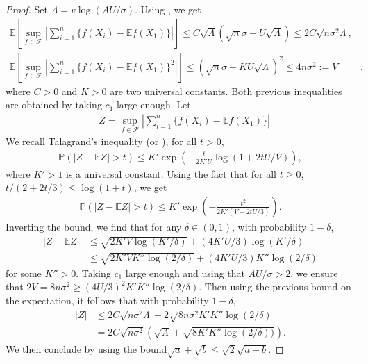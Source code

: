 \begin{proof}
Set $\Lambda = v\log(AU / \sigma )$. Using \cite[equation (2.5) and (2.6)]{gineConsistencyKernelDensity2001}, we get
\begin{align*}
\mathbb E\left [\sup_{f\in \mathcal F} \left| \sum_{i=1} ^n \{ f(X_i) - \mathbb E f(X_1) \}\right|\right] \leq  C\sqrt{\Lambda}\left( \sqrt n\sigma + U\sqrt{\Lambda}    \right) \leq 2 C \sqrt { n\sigma^2 \Lambda} , &\\
\mathbb E\left [\sup_{f\in \mathcal F} \left| \sum_{i=1} ^n \{ f(X_i) - \mathbb E f(X_1) \}^2\right|\right] \leq  \left( \sqrt n \sigma  +   KU  \sqrt {  \Lambda} \right)^2 \leq 4  n \sigma^2 := V&,
\end{align*}
where $C>0$ and $K>0$ are two universal constants. Both previous inequalities are obtained by taking $c_1$ large enough. Let
\begin{align*}
&Z = \sup_{f\in \mathcal F} \left| \sum_{i=1} ^n \{ f(X_i) - \mathbb E f(X_1) \}\right|
\end{align*}
We recall Talagrand's inequality \citep[Theorem 1.4]{talagrandNewConcentrationInequalities1996} (or \cite[equation (2.7)]{gineConsistencyKernelDensity2001}), for all $t>0$,
\begin{align*}
\mathbb P \left(| Z - \mathbb E Z | >t  \right )\leq K' \exp\left( - \frac{t}{2K'U} \log( 1+ 2tU / V)   \right),
\end{align*}
where $K'>1$ is a universal constant. Using the fact that for all $t\geq 0$, $  t / (2+2t/3) \leq \log( 1+ t )$, we get
\begin{align*}
\mathbb P \left(| Z - \mathbb E Z | >t  \right )\leq K' \exp\left( -  \frac{t^2  }{2K'(V+ 2tU / 3) }   \right).
\end{align*}
Inverting the bound, we find that for any $\delta\in (0,1)$, with probability $1-\delta$,
\begin{align*}
 | Z - \mathbb E Z | &\leq  \sqrt{ 2 K' V \log( K' / \delta)}  +  (4 K' U / 3) \log( K' / \delta) \\
 &\leq   \sqrt{ 2 K' V K''  \log( 2 / \delta)}  +  (4 K' U / 3)K'' \log( 2 / \delta)
  \end{align*} 
for some $K''>0$. Taking $c_1$ large enough and using that $AU/\sigma >2$, we ensure that $ 2V = 8 n \sigma^2 \geq (4U / 3)^2 K' K''\log(2 / \delta) $. Then using the previous bound on the expectation, it follows that with probability $1-\delta$,
\begin{align*}
 | Z|  & \leq  2 C \sqrt { n\sigma^2 \Lambda} + 2 \sqrt{ 8   n \sigma^2 K'K'' \log( 2 / \delta)}  \\
 & = 2C  \sqrt { n\sigma^2}    \left( \sqrt \Lambda + \sqrt{  8 K' K''  \log( 2 / \delta)) } \right).
\end{align*} 
We then conclude by using the bound$ \sqrt a + \sqrt b \leq \sqrt 2 \sqrt {a+b} $.
\end{proof}

